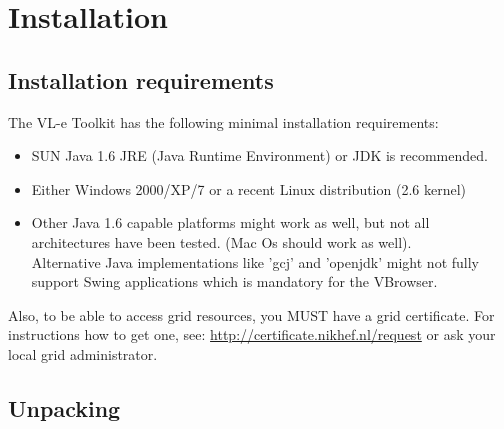 %
%


\chapter{Installation}
\label{chap:vlet_installation}

\section{Installation requirements}

The VL-e Toolkit has the following minimal installation requirements:
\begin{itemize}  
   \item SUN Java 1.6 JRE (Java Runtime Environment) or JDK is recommended.   
   \item Either Windows 2000/XP/7 or a recent Linux distribution (2.6 kernel)
   \item Other Java 1.6 capable platforms might work as well, but not all
   architectures have been tested. (Mac Os should work as well).\\
   Alternative Java implementations like 'gcj'  and 'openjdk' might not fully
   support Swing applications which is mandatory for the VBrowser. 
 \end{itemize} 

Also, to be able to access grid resources, you MUST have a grid certificate. 
For instructions how to get one, see:
\url{http://certificate.nikhef.nl/request} or ask your local grid administrator. 

\section{Unpacking}

